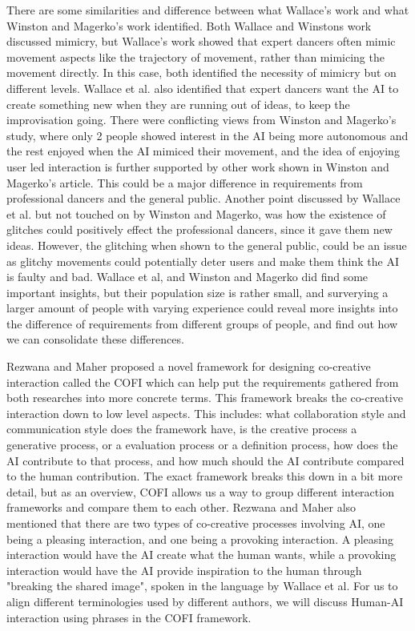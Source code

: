 \documentclass[final,5p,times,twocolumn,authoryear]{article}
\begin{document}
There are some similarities and difference between what Wallace's work
and what Winston and Magerko's work identified. Both Wallace and
Winstons work discussed mimicry, but Wallace's work showed that expert
dancers often mimic movement aspects like the trajectory of movement,
rather than mimicing the movement directly. In this case, both
identified the necessity of mimicry but on different levels. Wallace et
al. also identified that expert dancers want the AI to create something
new when they are running out of ideas, to keep the improvisation going.
There were conflicting views from Winston and Magerko's study, where
only 2 people showed interest in the AI being more autonomous and the
rest enjoyed when the AI mimiced their movement, and the idea of
enjoying user led interaction is further supported by other work shown
in Winston and Magerko's article. This could be a major
difference in requirements from professional dancers and the general
public. Another point discussed by Wallace et al. but not touched on by
Winston and Magerko, was how the existence of glitches could positively
effect the professional dancers, since it gave them new ideas. However,
the glitching when shown to the general public, could be an issue as
glitchy movements could potentially deter users and make them think the
AI is faulty and bad. Wallace et al, and Winston and Magerko did find some important
insights, but their population size is rather small, and surverying a
larger amount of people with varying experience could reveal more
insights into the difference of requirements from different groups of
people, and find out how we can consolidate these differences.

Rezwana and Maher proposed a novel framework for designing co-creative
interaction called the COFI which can help put the requirements gathered
from both researches into more concrete terms. This framework breaks the co-creative
interaction down to low level aspects. This includes: what collaboration style
and communication style does the framework have, is the creative process
a generative process, or a evaluation process or a definition process, how does the AI
contribute to that process, and how much should the AI contribute
compared to the human contribution. The exact framework breaks this down
in a bit more detail, but as an overview, COFI allows us a way to group
different interaction frameworks and compare them to each other. Rezwana
and Maher also mentioned that there are two types of co-creative
processes involving AI, one being a pleasing interaction, and one being
a provoking interaction. A pleasing interaction would have the AI create
what the human wants, while a provoking interaction would have the AI
provide inspiration to the human through "breaking the shared image",
spoken in the language by Wallace et al. For us to align different
terminologies used by different authors, we will discuss Human-AI
interaction using phrases in the COFI framework.
\end{document}
